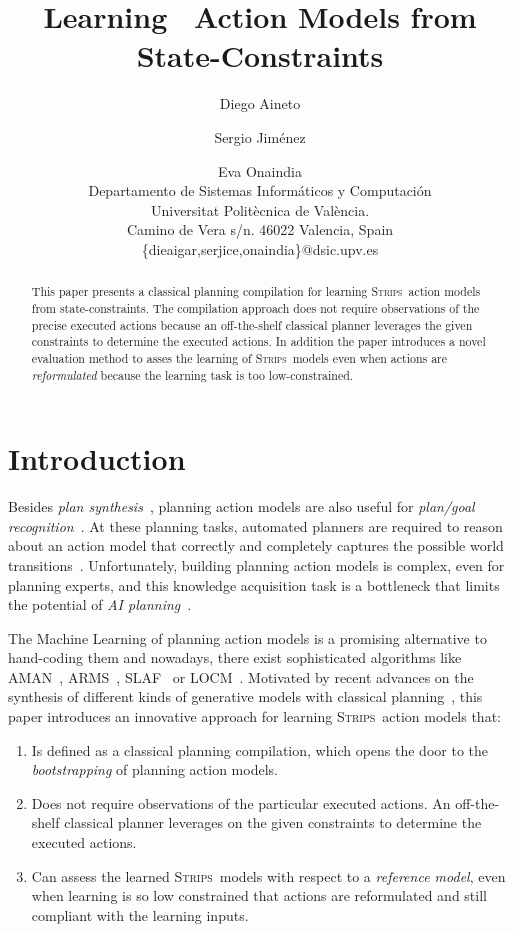 \documentclass{article}
\title{Learning \strips\ Action Models from State-Constraints}
\author{Diego Aineto\and Sergio Jim\'enez\and Eva Onaindia\\
{\small Departamento de Sistemas Inform\'aticos y Computaci\'on}\\
{\small Universitat Polit\`ecnica de Val\`encia.}\\
{\small Camino de Vera s/n. 46022 Valencia, Spain}\\
{\small \{dieaigar,serjice,onaindia\}@dsic.upv.es}}
\newcommand{\strips}{\textsc{Strips}}     %
\begin{document}
\maketitle

\begin{abstract}
This paper presents a classical planning compilation for learning \strips\ action models from state-constraints. The compilation approach does not require observations of the precise executed actions because an off-the-shelf classical planner leverages the given constraints to determine the executed actions. In addition the paper introduces a novel evaluation method to asses the learning of \strips\ models even when actions are {\em reformulated} because the learning task is too low-constrained. 
\end{abstract}

\section{Introduction}
Besides {\em plan synthesis}~\cite{ghallab2004automated}, planning action models are also useful for {\em plan/goal recognition}~\cite{ramirez2012plan}. At these planning tasks, automated planners are required to reason about an action model that correctly and completely captures the possible world transitions~\cite{geffner:book:2013}. Unfortunately, building planning action models is complex, even for planning experts, and this knowledge acquisition task is a bottleneck that limits the potential of {\em AI planning}~\cite{kambhampati:modellite:AAAI2007}.

The Machine Learning of planning action models is a promising alternative to hand-coding them and nowadays, there exist sophisticated algorithms like {\sc AMAN}~\cite{zhuo2013action}, {\sc ARMS}~\cite{yang2007learning}, {\sc SLAF}~\cite{amir:alearning:JAIR08} or {\sc LOCM}~\cite{cresswell2013acquiring}. Motivated by recent advances on the synthesis of different kinds of generative models with classical planning~\cite{bonet2009automatic,segovia2016hierarchical,segovia2017generating}, this paper introduces an innovative approach for learning \strips\ action models that:
\begin{enumerate}
\item Is defined as a classical planning compilation, which opens the door to the {\em bootstrapping} of planning action models.
\item Does not require observations of the particular executed actions. An off-the-shelf classical planner leverages on the given constraints to determine the executed actions.
\item Can assess the learned \strips\ models with respect to a {\em reference model}, even when learning is so low constrained that actions are reformulated and still compliant with the learning inputs. 
\end{enumerate}
 
\end{document}
